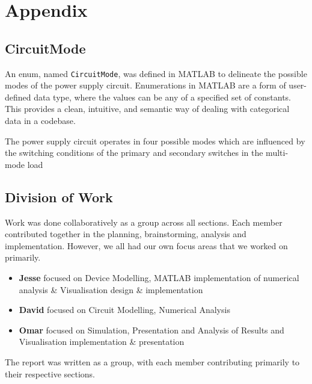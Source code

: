 \section*{Appendix}
\subsection*{CircuitMode}
An enum, named \texttt{CircuitMode}, was defined in MATLAB to delineate the possible modes of the power supply circuit. Enumerations in MATLAB are a form of user-defined data type, where the values can be any of a specified set of constants. This provides a clean, intuitive, and semantic way of dealing with categorical data in a codebase.
\leavevmode\newline

The power supply circuit operates in four possible modes which are influenced by the switching conditions of the primary and secondary switches in the multi-mode load



\subsection*{Division of Work}
Work was done collaboratively as a group across all sections. Each member contributed together in the planning, brainstorming, analysis and implementation. However, we all had our own focus areas that we worked on primarily.
\begin{itemize}
	\item \textbf{Jesse} focused on Device Modelling, MATLAB implementation of numerical analysis \& Visualisation design \& implementation
	\item \textbf{David} focused on Circuit Modelling, Numerical Analysis
	\item \textbf{Omar} focused on Simulation, Presentation and Analysis of Results and Visualisation implementation \& presentation
\end{itemize}
The report was written as a group, with each member contributing primarily to their respective sections.